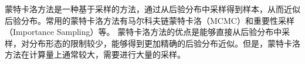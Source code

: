 蒙特卡洛方法\cite{metropolis1953equation}是一种基于采样的方法，通过从后验分布中采样得到样本，从而近似后验分布。常用的蒙特卡洛方法有马尔科夫链蒙特卡洛（MCMC）和重要性采样（Importance Sampling）等。
蒙特卡洛方法的优点是能够直接从后验分布中采样，对分布形态的限制较少，能够得到更加精确的后验分布近似。但是，蒙特卡洛方法在计算量上通常较大，需要进行大量的采样。

